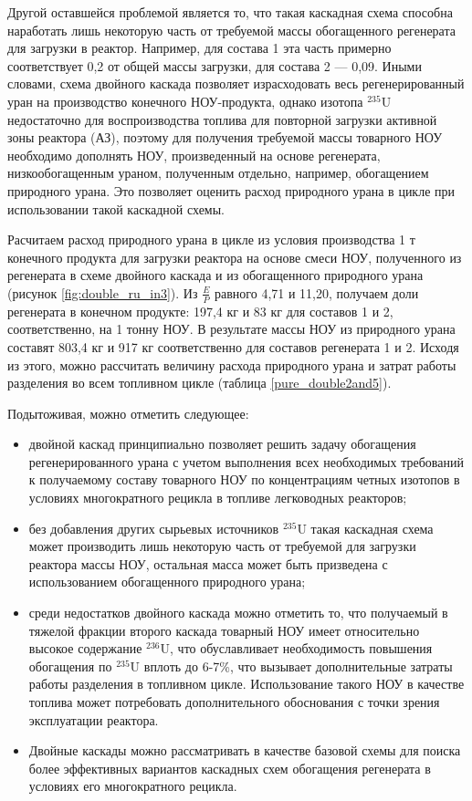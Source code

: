 Другой оставшейся проблемой является то, что такая каскадная схема способна наработать лишь некоторую часть от требуемой массы обогащенного регенерата для загрузки в реактор. Например, для состава 1 эта часть примерно соответствует 0,2 от общей массы загрузки, для состава 2 --- 0,09. Иными словами, схема двойного каскада позволяет израсходовать весь регенерированный уран на производство конечного НОУ-продукта, однако изотопа $^{235}$U недостаточно для воспроизводства топлива для повторной загрузки активной зоны реактора (АЗ), поэтому для получения требуемой массы товарного НОУ необходимо дополнять НОУ, произведенный на основе регенерата, низкообогащенным ураном, полученным отдельно, например, обогащением природного урана. Это позволяет оценить расход природного урана в цикле при использовании такой каскадной схемы. 

Расчитаем расход природного урана в цикле из условия производства 1 т конечного продукта для загрузки реактора на основе смеси НОУ, полученного из регенерата в схеме двойного каскада и из обогащенного природного урана (рисунок \ref{fig:double_ru_in3}). Из $\frac{E}{P}$ равного 4,71 и 11,20, получаем доли регенерата в конечном продукте: 197,4 кг и 83 кг для составов 1 и 2, соответственно, на 1 тонну НОУ. В результате массы НОУ из природного урана составят 803,4 кг и 917 кг соответственно для составов регенерата 1 и 2. Исходя из этого, можно рассчитать величину расхода природного урана и затрат работы разделения во всем топливном цикле (таблица \ref{pure_double2and5}).

Подытоживая, можно отметить следующее:

\begin{itemize}
    \item двойной каскад принципиально позволяет решить задачу обогащения регенерированного урана с учетом выполнения всех необходимых требований к получаемому составу товарного НОУ по концентрациям четных изотопов в условиях многократного рецикла в топливе легководных реакторов; 
    \item без добавления других сырьевых источников $^{235}$U такая каскадная схема может производить лишь некоторую часть от требуемой для загрузки реактора массы НОУ, остальная масса может быть призведена с использованием обогащенного природного урана;
    \item среди недостатков двойного каскада можно отметить то, что получаемый в тяжелой фракции второго каскада товарный НОУ имеет относительно высокое содержание $^{236}$U, что обуславливает необходимость повышения обогащения по $^{235}$U вплоть до 6-7\%, что вызывает дополнительные затраты работы разделения в топливном цикле. Использование такого НОУ в качестве топлива может потребовать дополнительного обоснования с точки зрения эксплуатации реактора.
    \item Двойные каскады можно рассматривать в качестве базовой схемы для поиска более эффективных вариантов каскадных схем обогащения регенерата в условиях его многократного рецикла.
\end{itemize}

